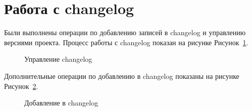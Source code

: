 \documentclass[
  12pt,
  a4paper,
  DIV=11,
  numbers=noendperiod]{scrreprt}
\begin{document}
\section{Работа с
changelog}\label{ux440ux430ux431ux43eux442ux430-ux441-changelog}

Были выполнены операции по добавлению записей в changelog и управлению
версиями проекта. Процесс работы с changelog показан на рисунке
Рисунок~\ref{fig-changelog}.

\begin{figure}


\caption{\label{fig-changelog}Управление changelog}

\end{figure}%

Дополнительные операции по добавлению в changelog показаны на рисунке
Рисунок~\ref{fig-add-changelog}.

\begin{figure}


\caption{\label{fig-add-changelog}Добавление в changelog}

\end{figure}%
\end{document}
